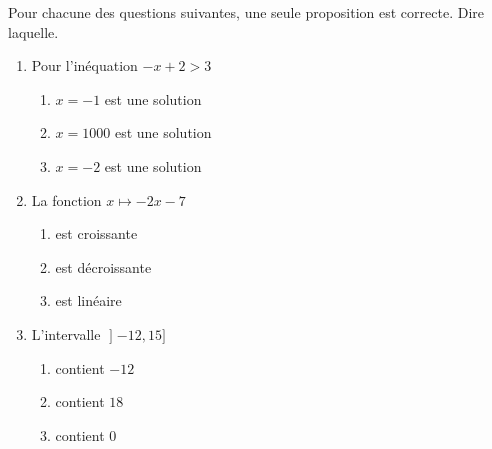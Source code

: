 
\begin{exercice}\label{exosmath-0519}

    Pour chacune des questions suivantes, une seule proposition est correcte. Dire laquelle.

    \begin{enumerate}
        \item
        Pour l'inéquation \( -x+2>3\)
        \begin{enumerate}
            \item
                
        \( x=-1\) est une solution\item\( x=1000\) est une solution\item\( x=-2\) est une solution \\
        \end{enumerate}
    \item 
        La fonction \( x\mapsto -2x-7\)
        \begin{enumerate}
                
            \item est croissante\item est décroissante\item est linéaire\\
        \end{enumerate}
    \item
        L'intervalle \( \mathopen] -12 , 15 \mathclose]\)
        \begin{enumerate}
                
    \item contient \( -12\)\item contient \( 18\)\item contient \( 0\)\\
        \end{enumerate}
            
    \end{enumerate}


\end{exercice}
